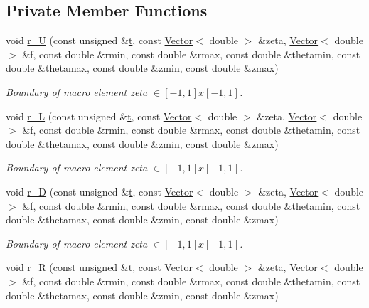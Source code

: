 \subsection*{Private Member Functions}
\begin{DoxyCompactItemize}
\item 
void \hyperlink{classoomph_1_1QuarterPipeDomain_a5c023c7a9d6e43d123566bc2f7bb21f0}{r\+\_\+U} (const unsigned \&\hyperlink{cfortran_8h_af6f0bd3dc13317f895c91323c25c2b8f}{t}, const \hyperlink{classoomph_1_1Vector}{Vector}$<$ double $>$ \&zeta, \hyperlink{classoomph_1_1Vector}{Vector}$<$ double $>$ \&f, const double \&rmin, const double \&rmax, const double \&thetamin, const double \&thetamax, const double \&zmin, const double \&zmax)
\begin{DoxyCompactList}\small\item\em Boundary of macro element zeta $ \in [-1,1]x[-1,1] $. \end{DoxyCompactList}\item 
void \hyperlink{classoomph_1_1QuarterPipeDomain_a21c58b76f546300c308d6e1f303a3433}{r\+\_\+L} (const unsigned \&\hyperlink{cfortran_8h_af6f0bd3dc13317f895c91323c25c2b8f}{t}, const \hyperlink{classoomph_1_1Vector}{Vector}$<$ double $>$ \&zeta, \hyperlink{classoomph_1_1Vector}{Vector}$<$ double $>$ \&f, const double \&rmin, const double \&rmax, const double \&thetamin, const double \&thetamax, const double \&zmin, const double \&zmax)
\begin{DoxyCompactList}\small\item\em Boundary of macro element zeta $ \in [-1,1]x[-1,1] $. \end{DoxyCompactList}\item 
void \hyperlink{classoomph_1_1QuarterPipeDomain_aeb6e4d3fbb8afb4ad2597601f1a46afd}{r\+\_\+D} (const unsigned \&\hyperlink{cfortran_8h_af6f0bd3dc13317f895c91323c25c2b8f}{t}, const \hyperlink{classoomph_1_1Vector}{Vector}$<$ double $>$ \&zeta, \hyperlink{classoomph_1_1Vector}{Vector}$<$ double $>$ \&f, const double \&rmin, const double \&rmax, const double \&thetamin, const double \&thetamax, const double \&zmin, const double \&zmax)
\begin{DoxyCompactList}\small\item\em Boundary of macro element zeta $ \in [-1,1]x[-1,1] $. \end{DoxyCompactList}\item 
void \hyperlink{classoomph_1_1QuarterPipeDomain_aab6f3fd79bc6dea1eb267f3b55630a2b}{r\+\_\+R} (const unsigned \&\hyperlink{cfortran_8h_af6f0bd3dc13317f895c91323c25c2b8f}{t}, const \hyperlink{classoomph_1_1Vector}{Vector}$<$ double $>$ \&zeta, \hyperlink{classoomph_1_1Vector}{Vector}$<$ double $>$ \&f, const double \&rmin, const double \&rmax, const double \&thetamin, const double \&thetamax, const double \&zmin, const double \&zmax)

\end{DoxyCompactItemize}
